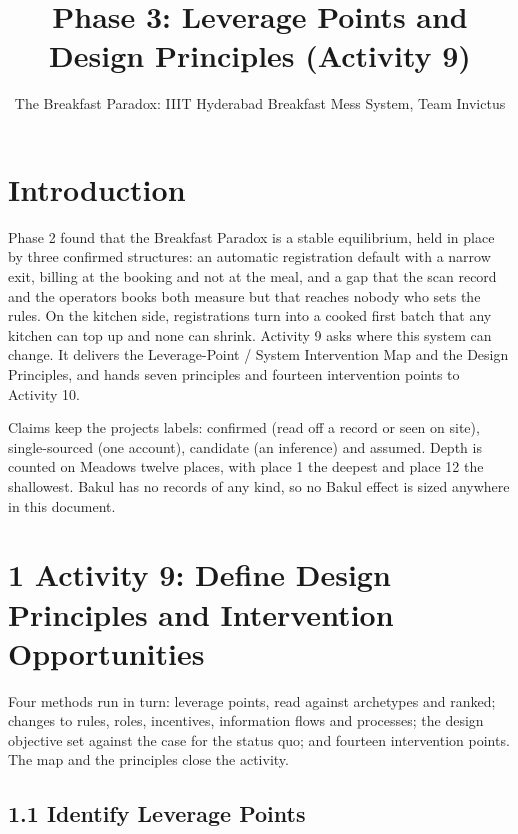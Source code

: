 \documentclass[
  10pt,
  table]{article}
\title{Phase 3: Leverage Points and Design Principles (Activity 9)}
\subtitle{The Breakfast Paradox: IIIT Hyderabad Breakfast Mess System, Team Invictus}
\author{}
\date{}
\makeatletter
\newcounter{none} %
\gdef\psubtitle{}
\renewcommand{\maketitle}{%
  \begingroup\raggedright
  {\color{pblue}\fontsize{24}{27}\selectfont\bfseries \@title\par}
  \vspace{3pt}{\color{pblue}\rule{\linewidth}{2.4pt}}\par\vspace{5pt}
  {\color{pslate}\large \psubtitle\par}
  \vspace{4pt}
  \endgroup}
\makeatother
\begin{document}
\maketitle

\renewcommand*\contentsname{Contents}
{
\hypersetup{linkcolor=pslate}
\setcounter{tocdepth}{2}
\tableofcontents
}
\section{Introduction}\label{introduction}

Phase 2 found that the Breakfast Paradox is a stable equilibrium, held in place by three confirmed structures: an automatic registration default with a narrow exit, billing at the booking and not at the meal, and a gap that the scan record and the operators\textquotesingle{} books both measure but that reaches nobody who sets the rules. On the kitchen side, registrations turn into a cooked first batch that any kitchen can top up and none can shrink. Activity 9 asks where this system can change. It delivers the Leverage-Point / System Intervention Map and the Design Principles, and hands seven principles and fourteen intervention points to Activity 10.

Claims keep the project\textquotesingle s labels: confirmed (read off a record or seen on site), single-sourced (one account), candidate (an inference) and assumed. Depth is counted on Meadows\textquotesingle{} twelve places, with place 1 the deepest and place 12 the shallowest. Bakul has no records of any kind, so no Bakul effect is sized anywhere in this document.

\section{1 Activity 9: Define Design Principles and Intervention Opportunities}\label{activity-9-define-design-principles-and-intervention-opportunities}

Four methods run in turn: leverage points, read against archetypes and ranked; changes to rules, roles, incentives, information flows and processes; the design objective set against the case for the status quo; and fourteen intervention points. The map and the principles close the activity.

\subsection{1.1 Identify Leverage Points}\label{identify-leverage-points}
\end{document}
